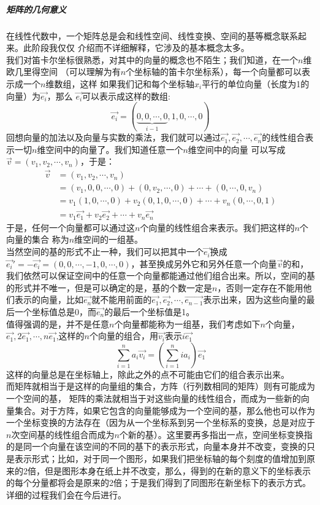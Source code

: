 \documentclass[a4paper,12pt]{ctexart}
\begin{document}
		\subparagraph{矩阵的几何意义}
		在线性代数中，一个矩阵总是会和线性空间、线性变换、空间的基等概念联系起来。此阶段我仅仅
		介绍而不详细解释，它涉及的基本概念太多。\\
		\indent
		我们对笛卡尔坐标很熟悉，对其中的向量的概念也不陌生；我们知道，在一个$n$维欧几里得空间
		（可以理解为有$n$个坐标轴的笛卡尔坐标系），每一个向量都可以表示成一个$n$维数组，这样
		如果我们记和每个坐标轴$x_i$平行的单位向量（长度为1的向量）为$\vec{e_i}$，那么
		$\vec{e_i}$可以表示成这样的数组:
		$$
		\vec{e_i} = (\underbrace{0,0,\cdots,0}_{i-1},1,0,\cdots,0)
		$$
		回想向量的加法以及向量与实数的乘法，我们就可以通过$\vec{e_1},\vec{e_2},\cdots
		,\vec{e_n}$的线性组合表示一切$n$维空间中的向量了。我们知道任意一个$n$维空间中的向量
		可以写成$\vec{v}=(v_1,v_2,\cdots,v_n)$，于是：
		\begin{align*}
		\vec{v} &= (v_1,v_2,\cdots,v_n)\\
				&= (v_1,0,0,\cdots,0)+(0,v_2,\cdots,0)+\cdots+(0,\cdots,0,v_n)\\
				&=v_1(1,0,\cdots,0)+v_2(0,1,0,\cdots,0)+\cdots+v_n(0,\cdots,0,1)\\
				&=v_1\vec{e_1}+v_2\vec{e_2}+\cdots+v_n\vec{e_n}
		\end{align*}
		于是，任何一个向量都可以通过这$n$个向量的线性组合来表示。我们把这样的$n$个向量的集合
		称为$n$维空间的一组基。\\
		\indent
		当然空间的基的形式不止一种，我们可以把其中一个$\vec{e_i}$换成$\vec{e_i}'=-\vec{e_i}=(0,0,\cdots,-1,0,\cdots,0)$，甚至换成另外它和另外任意一个向量$\vec{v}$的和，
		我们依然可以保证空间中的任意一个向量都能通过他们组合出来。所以，空间的基的形式并不唯一，但是可以确定的是，基的个数一定是$n$，否则一定存在不能用他们表示的向量，比如$\vec{e_n}$就不能用前面的$\vec{e_1},\vec{e_2},\cdots,\vec{e_{n-1}}$表示出来，因为这些向量的最后一个坐标值总是0，而$\vec{e_n}$的最后一个坐标值是1。\\
		\indent
		值得强调的是，并不是任意$n$个向量都能称为一组基，我们考虑如下$n$个向量，$\vec{e_1},2\vec{e_1},\cdots,n\vec{e_1}$,这样的$n$个向量的组合，用$\vec{v_i}$表示$i\vec{e_1}$
		$$
		\sum_{i=1}^{n}a_i\vec{v_i}=(\sum_{i=1}^{n}ia_i)\vec{e_1}
		$$
		这样的向量总是在坐标轴上，除此之外的点不可能由它们的组合表示出来。\\
		\indent
		而矩阵就相当于是这样的向量组的集合，方阵（行列数相同的矩阵）则有可能成为一个空间的基，
		矩阵的乘法就相当于对这些向量的线性组合，而成为一些新的向量集合。对于方阵，如果它包含的向量能够成为一个空间的基，那么他也可以作为一个坐标变换的方法存在（因为从一个坐标系到另一个坐标系的变换，总是对应于$n$次空间基的线性组合而成为$n$个新的基）。这里要再多指出一点，空间坐标变换指的是同一个向量在该空间的不同的基下的表示形式，向量本身并不改变，变换的只是表示形式；比如，对于同一个图形，如果我们把坐标轴的每个刻度的值增加到原来的2倍，但是图形本身在纸上并不改变，那么，得到的在新的意义下的坐标表示的每个分量都将会是原来的2倍；于是我们得到了同图形在新坐标下的表示方式。详细的过程我们会在今后进行。\\
\end{document}
